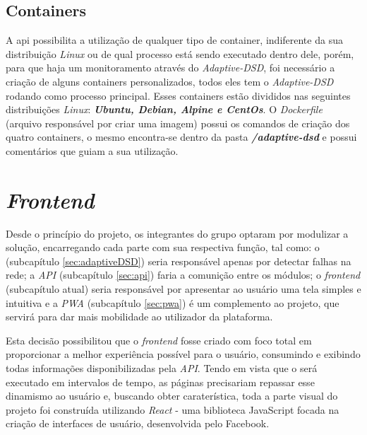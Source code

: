\subsection{Containers}
\label{subsec:containers}

A api possibilita a utilização de qualquer tipo de container, indiferente da sua distribuição \textit{Linux} ou de qual processo está sendo executado dentro dele, porém, para que haja um monitoramento através do \textit{Adaptive-DSD}, foi necessário a criação de alguns containers personalizados, todos eles tem o \textit{Adaptive-DSD} rodando como processo principal. Esses containers estão divididos nas seguintes distribuições \textit{Linux}: \textbf{\textit{Ubuntu, Debian, Alpine e CentOs}}. O \textit{Dockerfile} (arquivo responsável por criar uma imagem) possui os comandos de criação dos quatro containers, o mesmo encontra-se dentro da pasta \textbf{\textit{/adaptive-dsd}} e possui comentários que guiam a sua utilização.



\section{\textit{Frontend}}
\label{sec:frontend}

Desde o princípio do projeto, os integrantes do grupo optaram por modulizar a solução, encarregando cada parte com sua respectiva função, tal como: o \adaptive{} (subcapítulo \ref{sec:adaptiveDSD}) seria responsável apenas por detectar falhas na rede; a \textit{API} (subcapítulo \ref{sec:api}) faria a comunição entre os módulos; o \textit{frontend} (subcapítulo atual) seria responsável por apresentar ao usuário uma tela simples e intuitiva e a \textit{PWA} (subcapítulo \ref{sec:pwa}) é um complemento ao projeto, que servirá para dar mais mobilidade ao utilizador da plataforma.

Esta decisão possibilitou que o \textit{frontend} fosse criado com foco total em proporcionar a melhor experiência possível para o usuário, consumindo e exibindo todas informações disponibilizadas pela \textit{API}. Tendo em vista que o \adaptive{}será executado em intervalos de tempo, as páginas precisariam repassar esse dinamismo ao usuário e, buscando obter caraterística, toda a parte visual do projeto foi construída utilizando \textit{React} - uma biblioteca JavaScript focada na criação de interfaces de usuário, desenvolvida pelo Facebook.


